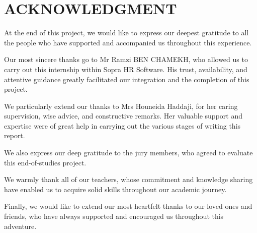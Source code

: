 ﻿\titlespacing*{\chapter}{0pt}{-2cm}{30pt}
\chapter*{ACKNOWLEDGMENT}
\titlespacing*{\chapter}{0pt}{0pt}{50pt}
\thispagestyle{MyStyle}

At the end of this project, we would like to express our deepest gratitude to all the people who have supported and accompanied us throughout this experience.

\vspace{0.5cm}

Our most sincere thanks go to Mr Ramzi BEN CHAMEKH, who allowed us to carry out this internship within Sopra HR Software. His trust, availability, and attentive guidance greatly facilitated our integration and the completion of this project.

\vspace{0.5cm}

We particularly extend our thanks to Mrs Houneida Haddaji, for her caring supervision, wise advice, and constructive remarks. Her valuable support and expertise were of great help in carrying out the various stages of writing this report.

\vspace{0.5cm}

We also express our deep gratitude to the jury members, who agreed to evaluate this end-of-studies project.

\vspace{0.5cm}

We warmly thank all of our teachers, whose commitment and knowledge sharing have enabled us to acquire solid skills throughout our academic journey.

\vspace{0.5cm}

Finally, we would like to extend our most heartfelt thanks to our loved ones and friends, who have always supported and encouraged us throughout this adventure.
